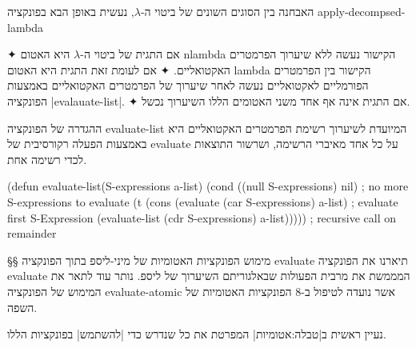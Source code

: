 האבחנה בין הסוגים השונים של ביטוי ה-$λ$, נעשית באופן הבא בפונקציה
apply-decompsed-lambda
\begin{itemize}
  ✦
  אם התגית של ביטוי ה-$λ$ היא האטום nlambda הקישור נעשה
  ללא שיערוך הפרמטרים
  האקטואליים.
  ✦ אם לעומת זאת התגית היא האטום lambda הקישור בין הפרמטרים הפורמליים
  לאקטואליים נעשה לאחר שיערוך של הפרמטרים האקטואליים באמצעות הפונקציה
  \E|evalauate-list|. ✦
  אם התגית אינה אף אחד משני האטומים הללו השיערוך נכשל.
\end{itemize}

ההגדרה של הפונקציה evaluate-list המיועדת לשיערוך רשימת הפרמטרים האקטואליים היא
באמצעות הפעלה רקורסיבית של evaluate על כל אחד מאיברי הרשימה, ושרשור התוצאות
לכדי רשימה אחת.
\begin{KERNEL}
(defun evaluate-list(S-expressions a-list)
  (cond ((null S-expressions) nil) ; no more S-expressions to evaluate
    (t (cons
          (evaluate (car S-expressions) a-list) ; evaluate first S-Expression
          (evaluate-list (cdr S-expressions) a-list))))) ; recursive call on remainder
\end{KERNEL}

§§ מימוש הפונקציות האטומיות של מיני-ליספ בתוך הפונקציה evaluate
תיארנו את הפונקציה evaluate המממשת את מרבית הפעולות שבאלגוריתם השיערוך של ליספ.
נותר עוד לתאר את המימוש של הפונקציה evaluate-atomic אשר נועדה לטיפול ב-8
הפונקציות האטומיות של השפה.

נעיין ראשית ב|טבלה:אטומיות| המפרטת את כל שנדרש כדי \ע|להשתמש| בפונקציות
הללו.

